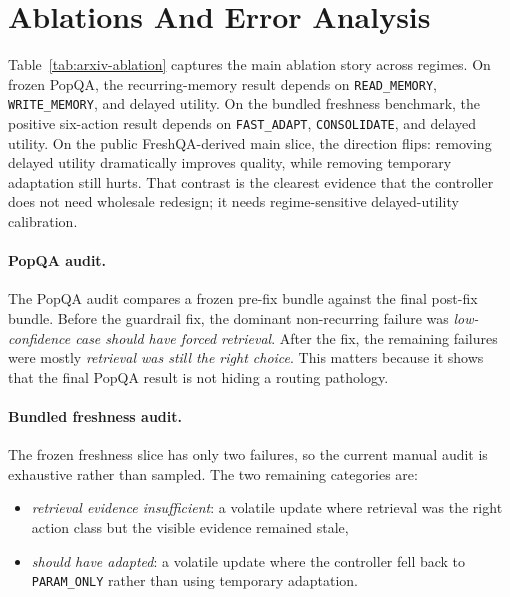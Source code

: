\section{Ablations And Error Analysis}

\begin{table}[h]
\centering
\small

\caption{Cross-benchmark ablation summary. Delayed utility helps in recurring-memory and bundled controlled-update regimes, but hurts on the public changing-answer track unless it is calibrated.}
\label{tab:arxiv-ablation}
\end{table}

Table~\ref{tab:arxiv-ablation} captures the main ablation story across regimes. On frozen PopQA, the recurring-memory result depends on \texttt{READ\_MEMORY}, \texttt{WRITE\_MEMORY}, and delayed utility. On the bundled freshness benchmark, the positive six-action result depends on \texttt{FAST\_ADAPT}, \texttt{CONSOLIDATE}, and delayed utility. On the public FreshQA-derived main slice, the direction flips: removing delayed utility dramatically improves quality, while removing temporary adaptation still hurts. That contrast is the clearest evidence that the controller does not need wholesale redesign; it needs regime-sensitive delayed-utility calibration.

\paragraph{PopQA audit.}
The PopQA audit compares a frozen pre-fix bundle against the final post-fix bundle. Before the guardrail fix, the dominant non-recurring failure was \emph{low-confidence case should have forced retrieval}. After the fix, the remaining failures were mostly \emph{retrieval was still the right choice}. This matters because it shows that the final PopQA result is not hiding a routing pathology.

\paragraph{Bundled freshness audit.}
The frozen freshness slice has only two failures, so the current manual audit is exhaustive rather than sampled. The two remaining categories are:
\begin{itemize}[leftmargin=1.5em]
\item \emph{retrieval evidence insufficient}: a volatile update where retrieval was the right action class but the visible evidence remained stale,
\item \emph{should have adapted}: a volatile update where the controller fell back to \texttt{PARAM\_ONLY} rather than using temporary adaptation.
\end{itemize}

